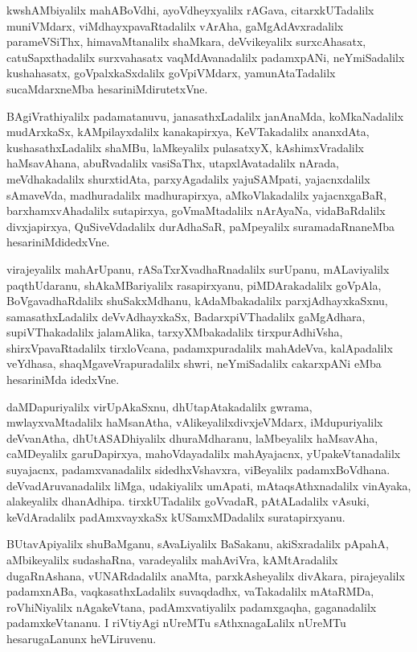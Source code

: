 \begin{mng}
kwshAMbiyalilx mahABoVdhi, ayoVdheyxyalilx rAGava, citarxkUTadalilx muniVMdarx, viMdhayxpavaRtadalilx vArAha, gaMgAdAvxradalilx parameVSiThx, himavaMtanalilx shaMkara, deVvikeyalilx surxcAhasatx, catuSapxthadalilx surxvahasatx vaqMdAvanadalilx padamxpANi, neYmiSadalilx kushahasatx, goVpalxkaSxdalilx goVpiVMdarx,  yamunAtaTadalilx sucaMdarxneMba hesariniMdirutetxVne.
\end{mng}

\begin{mng}
BAgiVrathiyalilx padamatanuvu, janasathxLadalilx janAnaMda, koMkaNadalilx mudArxkaSx, kAMpilayxdalilx kanakapirxya, KeVTakadalilx ananxdAta, kushasathxLadalilx shaMBu, laMkeyalilx pulasatxyX, kAshimxVradalilx haMsavAhana, abuRvadalilx vasiSaThx, utapxlAvatadalilx nArada, meVdhakadalilx shurxtidAta, parxyAgadalilx yajuSAMpati, yajacnxdalilx sAmaveVda, madhuradalilx madhurapirxya, aMkoVlakadalilx yajacnxgaBaR, barxhamxvAhadalilx sutapirxya, goVmaMtadalilx nArAyaNa, vidaBaRdalilx divxjapirxya, QuSiveVdadalilx durAdhaSaR, paMpeyalilx suramadaRnaneMba hesariniMdidedxVne.
\end{mng}

\begin{mng}
virajeyalilx mahArUpanu, rASaTxrXvadhaRnadalilx surUpanu, mALaviyalilx paqthUdaranu, shAkaMBariyalilx rasapirxyanu, piMDArakadalilx goVpAla, BoVgavadhaRdalilx shuSakxMdhanu, kAdaMbakadalilx parxjAdhayxkaSxnu, samasathxLadalilx deVvAdhayxkaSx, BadarxpiVThadalilx gaMgAdhara, supiVThakadalilx jalamAlika, tarxyXMbakadalilx tirxpurAdhiVsha, shirxVpavaRtadalilx tirxloVcana, padamxpuradalilx mahAdeVva, kalApadalilx veYdhasa, shaqMgaveVrapuradalilx shwri, neYmiSadalilx cakarxpANi eMba hesariniMda idedxVne.
\end{mng}

\begin{mng}
daMDapuriyalilx virUpAkaSxnu, dhUtapAtakadalilx gwrama, mwlayxvaMtadalilx haMsanAtha, vAlikeyalilxdivxjeVMdarx, iMdupuriyalilx deVvanAtha, dhUtASADhiyalilx dhuraMdharanu, laMbeyalilx haMsavAha, caMDeyalilx garuDapirxya, mahoVdayadalilx mahAyajacnx, yUpakeVtanadalilx suyajacnx, padamxvanadalilx sidedhxVshavxra, viBeyalilx padamxBoVdhana. deVvadAruvanadalilx liMga, udakiyalilx umApati, mAtaqsAthxnadalilx vinAyaka, alakeyalilx dhanAdhipa. tirxkUTadalilx goVvadaR, pAtALadalilx vAsuki, keVdAradalilx padAmxvayxkaSx kUSamxMDadalilx suratapirxyanu.
\end{mng}

\begin{mng}
BUtavApiyalilx shuBaMganu, sAvaLiyalilx BaSakanu, akiSxradalilx pApahA, aMbikeyalilx sudashaRna, varadeyalilx mahAviVra, kAMtAradalilx dugaRnAshana, vUNARdadalilx anaMta, parxkAsheyalilx divAkara, pirajeyalilx padamxnABa, vaqkasathxLadalilx suvaqdadhx, vaTakadalilx mAtaRMDa, roVhiNiyalilx nAgakeVtana, padAmxvatiyalilx padamxgaqha, gaganadalilx padamxkeVtananu. I riVtiyAgi nUreMTu sAthxnagaLalilx nUreMTu hesarugaLanunx heVLiruvenu.
\end{mng}

